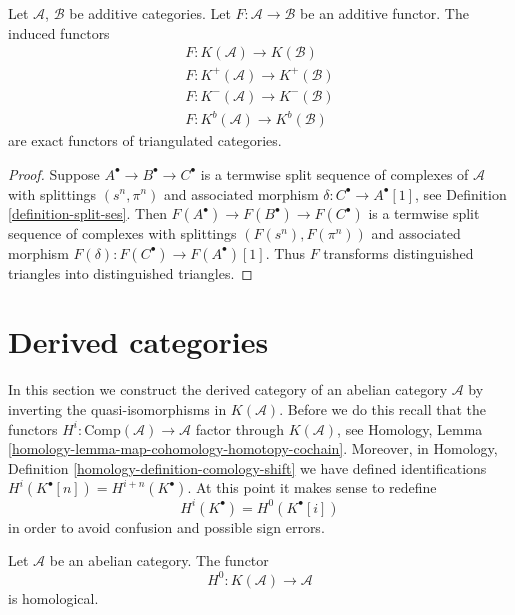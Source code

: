 \begin{lemma}
\label{lemma-additive-exact-homotopy-category}
Let $\mathcal{A}$, $\mathcal{B}$ be additive categories.
Let $F : \mathcal{A} \to \mathcal{B}$ be an additive functor.
The induced functors
$$
\begin{matrix}
F : K(\mathcal{A}) \longrightarrow K(\mathcal{B}) \\
F : K^{+}(\mathcal{A}) \longrightarrow K^{+}(\mathcal{B}) \\
F : K^{-}(\mathcal{A}) \longrightarrow K^{-}(\mathcal{B}) \\
F : K^b(\mathcal{A}) \longrightarrow K^b(\mathcal{B})
\end{matrix}
$$
are exact functors of triangulated categories.
\end{lemma}

\begin{proof}
Suppose $A^\bullet \to B^\bullet \to C^\bullet$
is a termwise split sequence of complexes of $\mathcal{A}$ with splittings
$(s^n, \pi^n)$ and associated morphism $\delta : C^\bullet \to A^\bullet[1]$,
see Definition \ref{definition-split-ses}. Then
$F(A^\bullet) \to F(B^\bullet) \to F(C^\bullet)$
is a termwise split sequence of complexes with splittings
$(F(s^n), F(\pi^n))$ and associated morphism
$F(\delta) : F(C^\bullet) \to F(A^\bullet)[1]$.
Thus $F$ transforms distinguished triangles into distinguished triangles.
\end{proof}




\section{Derived categories}
\label{section-derived-categories}

\noindent
In this section we construct the derived category of an abelian category
$\mathcal{A}$ by inverting the quasi-isomorphisms in $K(\mathcal{A})$.
Before we do this recall that the functors
$H^i : \text{Comp}(\mathcal{A}) \to \mathcal{A}$
factor through $K(\mathcal{A})$, see
Homology, Lemma \ref{homology-lemma-map-cohomology-homotopy-cochain}.
Moreover, in
Homology, Definition \ref{homology-definition-comology-shift}
we have defined identifications $H^i(K^\bullet[n]) = H^{i + n}(K^\bullet)$.
At this point it makes sense to redefine
$$
H^i(K^\bullet) = H^0(K^\bullet[i])
$$
in order to avoid confusion and possible sign errors.

\begin{lemma}
\label{lemma-cohomology-homological}
Let $\mathcal{A}$ be an abelian category. The functor
$$
H^0 : K(\mathcal{A}) \longrightarrow \mathcal{A}
$$
is homological.
\end{lemma}

